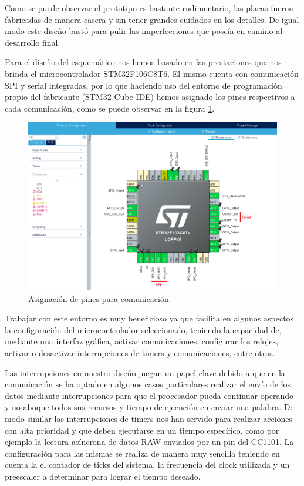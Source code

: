 
Como se puede observar el prototipo es bastante rudimentario, las placas fueron fabricadas de manera casera y sin tener grandes
cuidados en los detalles. De igual modo este diseño bastó para pulir las imperfecciones que poseía en camino al desarrollo final.\par 
Para el diseño del esquemático nos hemos basado en las prestaciones que nos brinda el microcontrolador STM32F106C8T6. El mismo
cuenta con comunicación SPI y serial integradas, por lo que haciendo uso del entorno de programación propio del fabricante 
(STM32 Cube IDE) hemos asignado los pines respectivos a cada comunicación, como se puede observar en la figura \ref{asignacion_pines}. \par

\begin{figure}
	\centering
	\includegraphics[scale=0.43]{images/nodos/asignacion_pines.png}
    \caption{Asignación de pines para comunicación}
	\label{asignacion_pines}
\end{figure}

Trabajar con este entorno es muy beneficioso ya que facilita en algunos aspectos la configuración del microcontrolador 
seleccionado, teniendo la capacidad de, mediante una interfaz gráfica, activar comunicaciones, configurar los relojes,
activar o desactivar interrupciones de timers y comunicaciones, entre otras. \par 
Las interrupciones en nuestro diseño juegan un papel clave debido a que en la comunicación se ha optado en algunos casos
particulares realizar el envío de los datos mediante interrupciones para que el procesador pueda continuar operando y no aboque 
todos sus recursos y tiempo de ejecución en enviar una palabra. De modo similar las interrupciones de timers nos han servido
para realizar acciones con alta prioridad y que deben ejecutarse en un tiempo específico, como por ejemplo la lectura asíncrona
de datos RAW enviados por un pin del CC1101. La configuración para las mismas se realiza de manera muy sencilla teniendo en 
cuenta la el contador de ticks del sistema, la frecuencia del clock utilizada y un preescaler a determinar para lograr el tiempo
deseado. \par 

